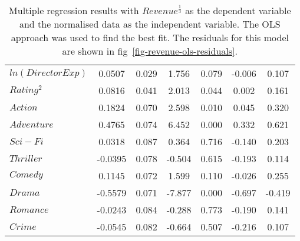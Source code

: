 \begin{table}[H]
\begin{center}
\begin{tabular}{lcccccc}
                    \textbf{$ln(Director Exp)$}     & 0.0507        & 0.029            & 1.756      & 0.079               & -0.006          & 0.107           \\
                    \textbf{$Rating^2$}             & 0.0816        & 0.041            & 2.013      & 0.044               & 0.002           & 0.161           \\
                    \textbf{$Action$}               & 0.1824        & 0.070            & 2.598      & 0.010               & 0.045           & 0.320           \\
                    \textbf{$Adventure$}            & 0.4765        & 0.074            & 6.452      & 0.000               & 0.332           & 0.621           \\
                    \textbf{$Sci-Fi$}               & 0.0318        & 0.087            & 0.364      & 0.716               & -0.140          & 0.203           \\
                    \textbf{$Thriller$}             & -0.0395       & 0.078            & -0.504     & 0.615               & -0.193          & 0.114           \\
                    \textbf{$Comedy$}               & 0.1145        & 0.072            & 1.599      & 0.110               & -0.026          & 0.255           \\
                    \textbf{$Drama$}                & -0.5579       & 0.071            & -7.877     & 0.000               & -0.697          & -0.419          \\
                    \textbf{$Romance$}              & -0.0243       & 0.084            & -0.288     & 0.773               & -0.190          & 0.141           \\
                    \textbf{$Crime$}                & -0.0545       & 0.082            & -0.664     & 0.507               & -0.216          & 0.107           \\
                    \bottomrule
                \end{tabular}
            \end{center}
            \caption[short]{Multiple regression results with $Revenue^{\frac{1}{3}}$ as the dependent variable
                and the normalised data as the independent variable.
                The OLS approach was used to find the best fit.
                The residuals for this model are shown in fig~\ref{fig-revenue-ols-residuals}.
            }\label{tab-revenue-ols-summary}
        \end{table}

